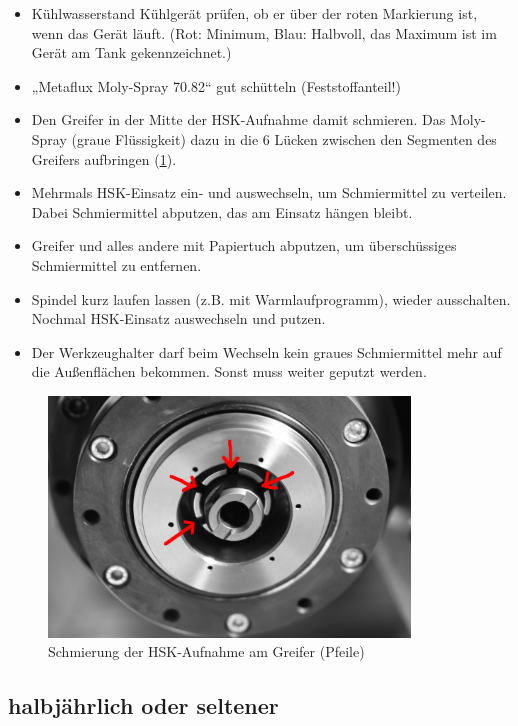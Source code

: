 \documentclass{\basedir/fablab-document}
\begin{document}
\begin{itemize}
	\item Kühlwasserstand Kühlgerät prüfen, ob er über der roten Markierung ist, wenn das Gerät läuft. (Rot: Minimum, Blau: Halbvoll, das Maximum ist im Gerät am Tank gekennzeichnet.)
	\item „Metaflux Moly-Spray 70.82“ gut schütteln (Feststoffanteil!)
	\item Den Greifer in der Mitte der HSK-Aufnahme damit schmieren. Das Moly-Spray (graue Flüssigkeit) dazu in die 6 Lücken zwischen den Segmenten des Greifers aufbringen (\cref{fig:hsk-greifer}). 
	\item Mehrmals HSK-Einsatz ein- und auswechseln, um Schmiermittel zu verteilen. Dabei Schmiermittel abputzen, das am Einsatz hängen bleibt.
	\item Greifer und alles andere mit Papiertuch abputzen, um überschüssiges Schmiermittel zu entfernen.
	\item Spindel kurz laufen lassen (z.B. mit Warmlaufprogramm), wieder ausschalten. Nochmal HSK-Einsatz auswechseln und putzen.
	\item Der Werkzeughalter darf beim Wechseln kein graues Schmiermittel mehr auf die Außenflächen bekommen. Sonst muss weiter geputzt werden.
\end{itemize}

\begin{figure}[ht]
\centering
\includegraphics[height=6.4cm]{./img/hsk-aufnahme-segmente.jpg}
\caption{Schmierung der HSK-Aufnahme am Greifer (Pfeile)}
\label{fig:hsk-greifer}
\end{figure}

\subsection{halbjährlich oder seltener}
\end{document}
